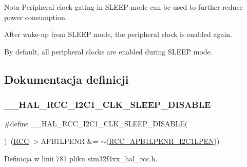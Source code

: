 \begin{DoxyNote}{Nota}
Peripheral clock gating in S\+L\+E\+EP mode can be used to further reduce power consumption. 

After wake-\/up from S\+L\+E\+EP mode, the peripheral clock is enabled again. 

By default, all peripheral clocks are enabled during S\+L\+E\+EP mode. 
\end{DoxyNote}


\subsection{Dokumentacja definicji}
\mbox{\label{group___r_c_c___a_p_b1___low_power___enable___disable_gac7dc1c5239cd70bee94eefa3d91cdd7a}} 
\subsubsection{\texorpdfstring{\+\_\+\+\_\+\+H\+A\+L\+\_\+\+R\+C\+C\+\_\+\+I2\+C1\+\_\+\+C\+L\+K\+\_\+\+S\+L\+E\+E\+P\+\_\+\+D\+I\+S\+A\+B\+LE}{\_\_HAL\_RCC\_I2C1\_CLK\_SLEEP\_DISABLE}}
{\footnotesize\ttfamily \#define \+\_\+\+\_\+\+H\+A\+L\+\_\+\+R\+C\+C\+\_\+\+I2\+C1\+\_\+\+C\+L\+K\+\_\+\+S\+L\+E\+E\+P\+\_\+\+D\+I\+S\+A\+B\+LE(\begin{DoxyParamCaption}{ }\end{DoxyParamCaption})~(\hyperlink{group___peripheral__declaration_ga74944438a086975793d26ae48d5882d4}{R\+CC}-\/$>$A\+P\+B1\+L\+P\+E\+NR \&= $\sim$(\hyperlink{group___peripheral___registers___bits___definition_ga33286469d0a9b9fedbc2b60aa6cd7da7}{R\+C\+C\+\_\+\+A\+P\+B1\+L\+P\+E\+N\+R\+\_\+\+I2\+C1\+L\+P\+EN}))}



Definicja w linii 781 pliku stm32f4xx\+\_\+hal\+\_\+rcc.\+h.

